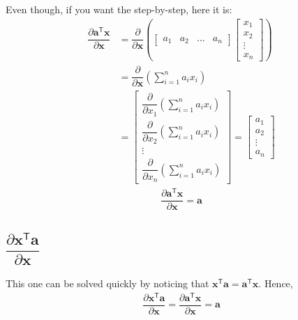 \documentclass{article}
\newcommand{\trans}{\mathsf{T}}
\begin{document}
Even though, if you want the step-by-step, here it is:
\begin{align}
    \dfrac{\partial \mathbf{a}^\trans \mathbf{x}}{\partial \mathbf{x}} &= \dfrac{\partial}{\partial \mathbf{x}} \left(
    \begin{bmatrix}
        a_1 & a_2 & \dots & a_n
    \end{bmatrix} \begin{bmatrix}
        x_{1} \\ x_{2} \\ \vdots \\ x_{n}
    \end{bmatrix} \right) \\
    & = \dfrac{\partial}{\partial \mathbf{x}} \left( \sum_{i = 1}^n a_ix_i \right) \\
    & = \begin{bmatrix}
        \dfrac{\partial}{\partial x_1} \left( \sum_{i = 1}^n a_ix_i \right) \\ \dfrac{\partial}{\partial x_2} \left( \sum_{i = 1}^n a_ix_i \right) \\ \vdots \\ \dfrac{\partial}{\partial x_n} \left( \sum_{i = 1}^n a_ix_i \right) 
    \end{bmatrix} = \begin{bmatrix}
        a_1 \\ a_2 \\ \vdots \\ a_n
    \end{bmatrix}
\end{align}
\begin{align}
    \boxed{\dfrac{\partial \mathbf{a}^\trans \mathbf{x}}{\partial \mathbf{x}} = \mathbf{a}}
\end{align}

\subsection{\(\dfrac{\partial \mathbf{x}^\trans  \mathbf{a}}{\partial \mathbf{x}}\)}

This one can be solved quickly by noticing that \(\mathbf{x}^\trans  \mathbf{a} = \mathbf{a}^\trans  \mathbf{x}\). Hence,
\begin{align}
    \dfrac{\partial \mathbf{x}^\trans  \mathbf{a}}{\partial \mathbf{x}} = \dfrac{\partial \mathbf{a}^\trans  \mathbf{x}}{\partial \mathbf{x}} = \mathbf{a}
\end{align}
\end{document}
